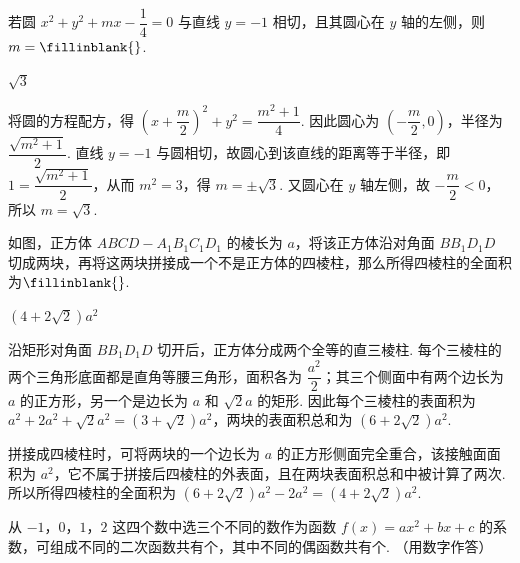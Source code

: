 \begin{problem}
若圆 \(x^2+y^2+mx-\dfrac14=0\) 与直线 \(y=-1\) 相切，且其圆心在 \(y\) 轴的左侧，则 \(m=\fillinblank{}\).
\end{problem}

\begin{answer}
\(\sqrt3\)
\end{answer}

\begin{solution}
将圆的方程配方，得 \(\left(x+\dfrac m2\right)^2+y^2=\dfrac{m^2+1}{4}\). 因此圆心为 \(\left(-\dfrac m2,0\right)\)，半径为 \(\dfrac{\sqrt{m^2+1}}2\). 直线 \(y=-1\) 与圆相切，故圆心到该直线的距离等于半径，即 \(1=\dfrac{\sqrt{m^2+1}}2\)，从而 \(m^2=3\)，得 \(m=\pm\sqrt3\). 又圆心在 \(y\) 轴左侧，故 \(-\dfrac m2<0\)，所以 \(m=\sqrt3\).
\end{solution}

\begin{problem}
如图，正方体 \(ABCD-A_1B_1C_1D_1\) 的棱长为 \(a\)，将该正方体沿对角面 \(BB_1D_1D\) 切成两块，再将这两块拼接成一个不是正方体的四棱柱，那么所得四棱柱的全面积为\(\fillinblank{}\).

\end{problem}

\begin{answer}
\(\left(4+2\sqrt2\right)a^2\)
\end{answer}

\begin{solution}
沿矩形对角面 \(BB_1D_1D\) 切开后，正方体分成两个全等的直三棱柱. 每个三棱柱的两个三角形底面都是直角等腰三角形，面积各为 \(\dfrac{a^2}{2}\)；其三个侧面中有两个边长为 \(a\) 的正方形，另一个是边长为 \(a\) 和 \(\sqrt2a\) 的矩形. 因此每个三棱柱的表面积为 \(a^2+2a^2+\sqrt2a^2=(3+\sqrt2)a^2\)，两块的表面积总和为 \((6+2\sqrt2)a^2\).

拼接成四棱柱时，可将两块的一个边长为 \(a\) 的正方形侧面完全重合，该接触面面积为 \(a^2\)，它不属于拼接后四棱柱的外表面，且在两块表面积总和中被计算了两次. 所以所得四棱柱的全面积为 \((6+2\sqrt2)a^2-2a^2=(4+2\sqrt2)a^2\).
\end{solution}

\begin{problem}
从 \(-1\)，\(0\)，\(1\)，\(2\) 这四个数中选三个不同的数作为函数 \(f(x)=ax^2+bx+c\) 的系数，可组成不同的二次函数共有\fillinblank{}个，其中不同的偶函数共有\fillinblank{}个. （用数字作答）
\end{problem}

